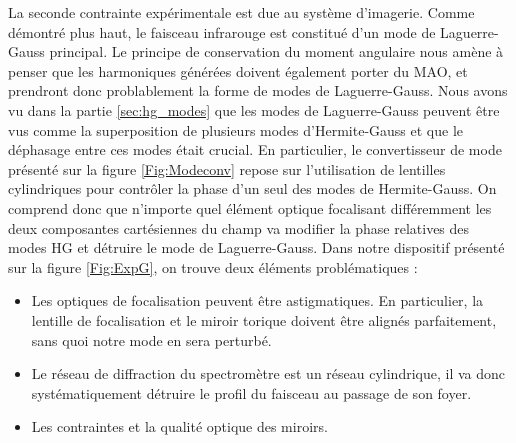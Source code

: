 La seconde contrainte expérimentale est due au système d'imagerie. Comme démontré plus haut, le faisceau infrarouge est constitué d'un mode de Laguerre-Gauss principal. Le principe de conservation du moment angulaire nous amène à penser que les harmoniques générées doivent également porter du MAO, et prendront donc problablement la forme de modes de Laguerre-Gauss. Nous avons vu dans la partie \ref{sec:hg_modes} que les modes de Laguerre-Gauss peuvent être vus comme la superposition de plusieurs modes d'Hermite-Gauss et que le déphasage entre ces modes était crucial. En particulier, le convertisseur de mode présenté sur la figure \ref{Fig:Modeconv} repose sur l'utilisation de lentilles cylindriques pour contrôler la phase d'un seul des modes de Hermite-Gauss. On comprend donc que n'importe quel élément optique focalisant différemment les deux composantes cartésiennes du champ va modifier la phase relatives des modes HG et détruire le mode de Laguerre-Gauss. Dans notre dispositif présenté sur la figure \ref{Fig:ExpG}, on trouve deux éléments problématiques :

\begin{itemize}
\item Les optiques de focalisation peuvent être astigmatiques. En particulier, la lentille de focalisation et le miroir torique doivent être alignés parfaitement, sans quoi notre mode en sera perturbé.\\
\item Le réseau de diffraction du spectromètre est un réseau cylindrique, il va donc systématiquement détruire le profil du faisceau au passage de son foyer.\\
\item Les contraintes et la qualité optique des miroirs.
\end{itemize}


